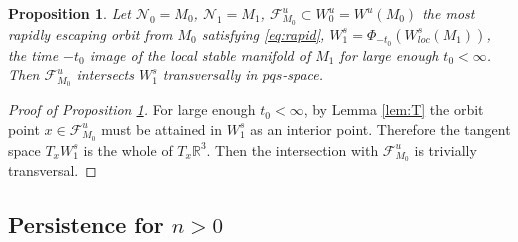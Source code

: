 \documentclass[a4paper,11pt]{article}
\newtheorem{proposition}{Proposition}[section]
\theoremstyle{remark}
\begin{document}
\begin{proposition} \label{prop:singular}
 Let $\mathcal{N}_0=M_0$, $\mathcal{N}_1=M_1$, $\mathcal{F}^u_{M_0}\subset W^u_0=W^u(M_0)$ the most rapidly escaping orbit from $M_0$ satisfying \eqref{eq:rapid}, $W^s_1=\Phi_{-t_0}(W^s_{loc}(M_1))$, the time $-t_0$ image of the local stable manifold of $M_1$ for large enough $t_0<\infty$. Then $\mathcal{F}^u_{M_0}$ intersects $W^s_1$ transversally in $pqs$-space.
\end{proposition}
\begin{proof}[Proof of Proposition \ref{prop:singular}]
%
For large enough $t_0<\infty$, by Lemma \ref{lem:T} the orbit point $x\in \mathcal{F}^u_{M_0}$ must be attained in $W^s_1$ as an interior point. Therefore the tangent space ${T}_x W^s_1$ is the whole of ${T}_x \mathbb{R}^3$. Then the intersection with $\mathcal{F}^u_{M_0}$ is trivially transversal.
\end{proof}

\subsection{Persistence for $n>0$} \label{sec:thmproof}
\end{document}
